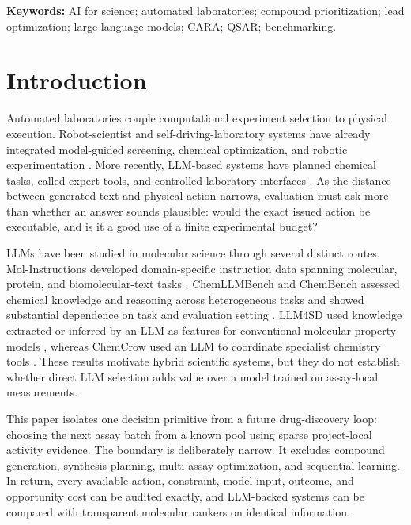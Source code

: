 \documentclass[10pt,a4paper]{article}
\begin{document}
\noindent\textbf{Keywords:} AI for science; automated laboratories; compound
prioritization; lead optimization; large language models; CARA; QSAR;
benchmarking.

\section{Introduction}

Automated laboratories couple computational experiment selection to physical
execution. Robot-scientist and self-driving-laboratory systems have already
integrated model-guided screening, chemical optimization, and robotic
experimentation \cite{williams2015eve,burger2020robot}. More recently, LLM-based
systems have planned chemical tasks, called expert tools, and controlled
laboratory interfaces \cite{boiko2023coscientist,bran2024chemcrow}. As the
distance between generated text and physical action narrows, evaluation must
ask more than whether an answer sounds plausible: would the exact issued action
be executable, and is it a good use of a finite experimental budget?

LLMs have been studied in molecular science through several distinct routes.
Mol-Instructions developed domain-specific instruction data spanning molecular,
protein, and biomolecular-text tasks \cite{fang2024molinstructions}.
ChemLLMBench and ChemBench assessed chemical knowledge and reasoning across
heterogeneous tasks and showed substantial dependence on task and evaluation
setting \cite{guo2023chemllmbench,mirza2025chembench}. LLM4SD used knowledge
extracted or inferred by an LLM as features for conventional molecular-property
models \cite{zheng2025llm4sd}, whereas ChemCrow used an LLM to coordinate
specialist chemistry tools \cite{bran2024chemcrow}. These results motivate
hybrid scientific systems, but they do not establish whether direct LLM
selection adds value over a model trained on assay-local measurements.

This paper isolates one decision primitive from a future drug-discovery loop:
choosing the next assay batch from a known pool using sparse project-local
activity evidence. The boundary is deliberately narrow. It excludes compound
generation, synthesis planning, multi-assay optimization, and sequential
learning. In return, every available action, constraint, model input, outcome,
and opportunity cost can be audited exactly, and LLM-backed systems can be
compared with transparent molecular rankers on identical information.
\end{document}
